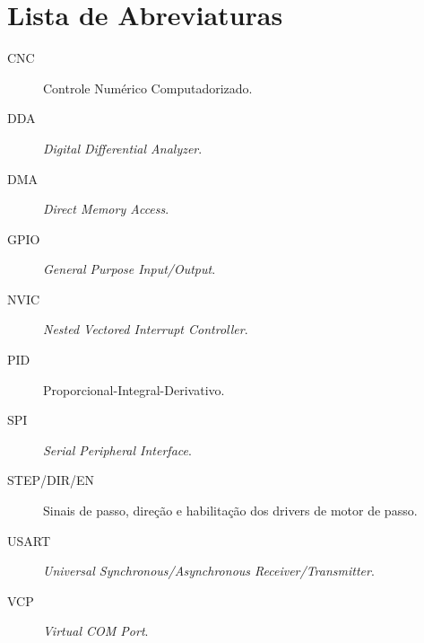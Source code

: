 \chapter*{Lista de Abreviaturas}

\begin{description}
  \item[CNC] \quad Controle Numérico Computadorizado.
  \item[DDA] \quad \emph{Digital Differential Analyzer}.
  \item[DMA] \quad \emph{Direct Memory Access}.
  \item[GPIO] \quad \emph{General Purpose Input/Output}.
  \item[NVIC] \quad \emph{Nested Vectored Interrupt Controller}.
  \item[PID] \quad Proporcional-Integral-Derivativo.
  \item[SPI] \quad \emph{Serial Peripheral Interface}.
  \item[STEP/DIR/EN] \quad Sinais de passo, direção e habilitação dos drivers de motor de passo.
  \item[USART] \quad \emph{Universal Synchronous/Asynchronous Receiver/Transmitter}.
  \item[VCP] \quad \emph{Virtual COM Port}.
\end{description}
